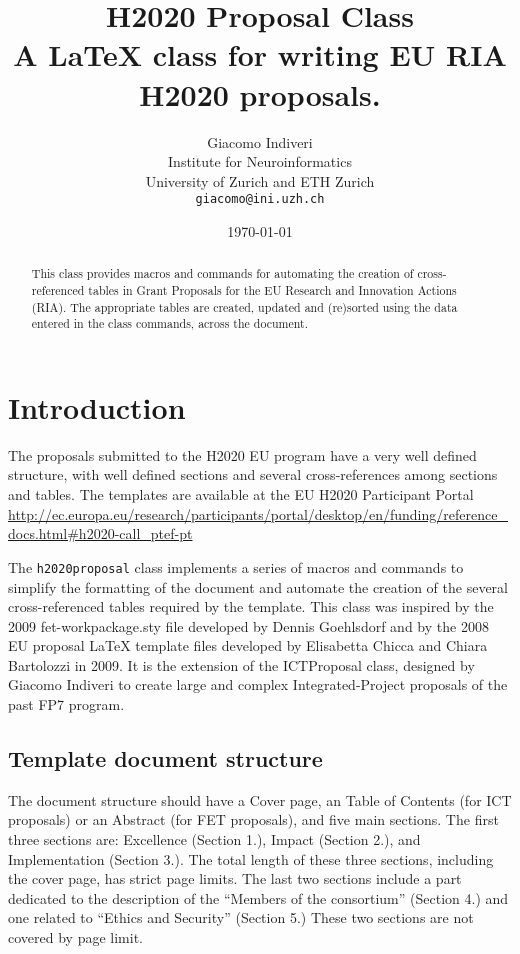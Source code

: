 \documentclass[pdftext]{article}
\title{H2020 Proposal Class\\
  A LaTeX class for writing EU RIA H2020 proposals.}
\author{Giacomo Indiveri\\
  Institute for Neuroinformatics\\
  University of Zurich and ETH Zurich\\
  \texttt{giacomo@ini.uzh.ch} }
\date{\today}
\begin{document}
\maketitle

\begin{abstract}
This class provides macros and commands for automating the creation of cross-referenced tables in Grant Proposals for the EU Research and Innovation Actions (RIA). The appropriate tables are created, updated and (re)sorted using the data entered in the class commands, across the document. 
\end{abstract}

\tableofcontents

\section{Introduction}
\label{sec:introduction}

The proposals submitted to the H2020 EU program have a very well defined structure, with well defined sections and several cross-references among sections and tables. The templates are available at the EU H2020 Participant Portal \url{http://ec.europa.eu/research/participants/portal/desktop/en/funding/reference_docs.html#h2020-call_ptef-pt}

The \texttt{h2020proposal} class implements a series of macros and commands to simplify the formatting of the document and automate the creation of the several cross-referenced tables required by the template.  This class was inspired by the 2009 fet-workpackage.sty  file developed by Dennis Goehlsdorf and by the 2008 EU proposal LaTeX template files developed by Elisabetta Chicca and Chiara Bartolozzi in 2009. It is the extension of the ICTProposal class, designed by Giacomo Indiveri to create large and complex Integrated-Project proposals of the past FP7 program. 

\subsection{Template document structure}

The document structure should have a Cover page, an Table of Contents (for ICT proposals) or an Abstract (for FET proposals), and five main sections. The first three sections are: Excellence (Section 1.), Impact (Section 2.), and Implementation (Section 3.). The total length of these three sections, including the cover page, has strict page limits. 
The last two sections include a part dedicated to the description of the ``Members of the consortium'' (Section 4.) and one related to ``Ethics and Security'' (Section  5.) These two sections are not covered by page limit.
\end{document}
